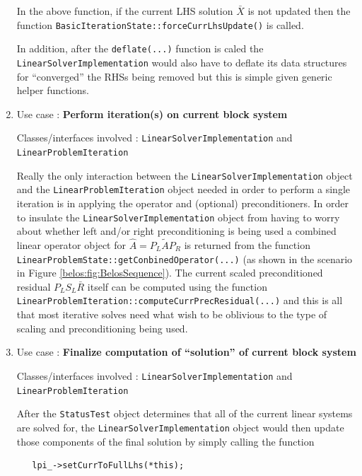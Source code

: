 \documentclass[pdf,ps2pdf,11pt]{SANDreport}
\begin{document}
\begin{enumerate}
In the above function, if the current LHS solution $\bar{X}$ is not
updated then the function
{}\texttt{Basic\-Iteration\-State\-::force\-Curr\-Lhs\-Update()} is
called.

In addition, after the {}\texttt{deflate(...)} function is caled the
{}\texttt{Linear\-Solver\-Implementation} would also have to deflate
its data structures for ``converged'' the RHSs being removed but this
is simple given generic helper functions.

{}\item Use case : \textbf{Perform iteration(s) on current block
system}

{}\noindent{}Classes/interfaces involved :
{}\texttt{Linear\-Solver\-Implementation} and
{}\texttt{Linear\-Problem\-Iteration}

Really the only interaction between the
{}\texttt{Linear\-Solver\-Implementation} object and the
{}\texttt{Linear\-Problem\-Iteration} object needed in order to
perform a single iteration is in applying the operator and (optional)
preconditioners.  In order to insulate the
{}\texttt{Linear\-Solver\-Implementation} object from having to worry
about whether left and/or right preconditioning is being used a
combined linear operator object for $\hat{A} = P_L \tilde{A} P_R$ is
returned from the function
{}\texttt{Linear\-Problem\-State::\-get\-Conbined\-Operator(...)} (as
shown in the scenario in Figure {}\ref{belos:fig:BelosSequence}).  The
current scaled preconditioned residual $P_L S_L \bar{R}$ itself can be
computed using the function
{}\texttt{Linear\-Problem\-Iteration::\-compute\-Curr\-Prec\-Residual(...)} 
and this is all that most iterative solves need what wish to be
oblivious to the type of scaling and preconditioning being used.

{}\item Use case : \textbf{Finalize computation of ``solution'' of
current block system}

{}\noindent{}Classes/interfaces involved :
{}\texttt{Linear\-Solver\-Implementation} and
{}\texttt{Linear\-Problem\-Iteration}

After the {}\texttt{Status\-Test} object determines that all of the
current linear systems are solved for, the
{}\texttt{Linear\-Solver\-Implementation} object would then update
those components of the final solution by simply calling the function

{\scriptsize\begin{verbatim}
   lpi_->setCurrToFullLhs(*this);
\end{verbatim}}


\end{enumerate}
\end{document}
